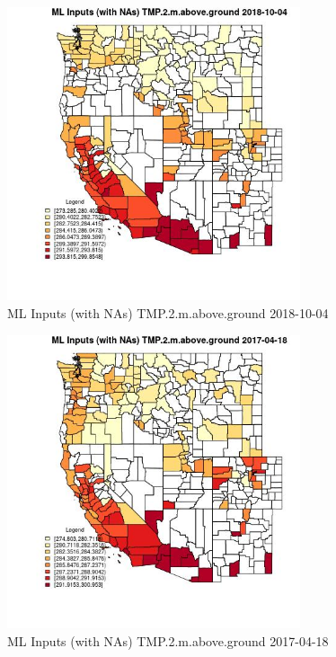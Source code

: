 \begin{figure} 
\centering  
\includegraphics[width=0.77\textwidth]{Code_Outputs/Report_ML_input_PM25_Step4_part_f_de_duplicated_aveswNAs_CountyTMP2mabovegroundMean2018-10-04.jpg} 
\caption{\label{fig:Report_ML_input_PM25_Step4_part_f_de_duplicated_aveswNAsCountyTMP2mabovegroundMean2018-10-04}ML Inputs (with NAs) TMP.2.m.above.ground 2018-10-04} 
\end{figure} 
 

\begin{figure} 
\centering  
\includegraphics[width=0.77\textwidth]{Code_Outputs/Report_ML_input_PM25_Step4_part_f_de_duplicated_aveswNAs_CountyTMP2mabovegroundMean2017-04-18.jpg} 
\caption{\label{fig:Report_ML_input_PM25_Step4_part_f_de_duplicated_aveswNAsCountyTMP2mabovegroundMean2017-04-18}ML Inputs (with NAs) TMP.2.m.above.ground 2017-04-18} 
\end{figure} 
 

